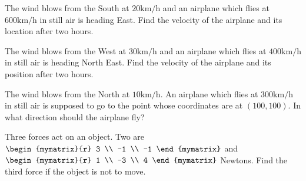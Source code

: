 
\begin{ex} The wind blows from the South at $20\textrm{km}/\textrm{h}$ and an
airplane which flies at $600\textrm{km}/\textrm{h}$ in still air is heading
East. Find the velocity of the airplane and its location after
two hours. \vspace{1mm}
\end{ex}

\begin{ex} The wind blows from the West at $30\textrm{km}/\textrm{h}$ and an
airplane which flies at $400\textrm{km}/\textrm{h}$ in still air is heading
North East. Find the velocity of the airplane and its position
after two hours. \vspace{1mm}
\end{ex}

\begin{ex} The wind blows from the North at $10\textrm{km}/\textrm{h}$. An
airplane which flies at $300\textrm{km}/\textrm{h}$ in still air is supposed
to go to the point whose coordinates are at $(100, 100). $ In what direction should the airplane fly? \vspace{1mm}
\end{ex}

\begin{ex} Three forces act on an object. Two are $\begin{mymatrix}{r}
3 \\
-1 \\
-1
\end{mymatrix} $ and $\begin{mymatrix}{r}
1 \\
-3 \\
4
\end{mymatrix} $ Newtons. Find the third force if the object is not to move.
\vspace{1mm}
\end{ex}

